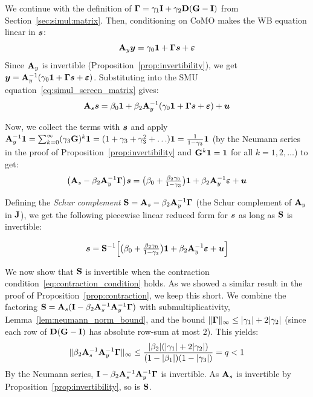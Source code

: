 We continue with the definition of $\mathbf{\Gamma} = \gamma_1\mathbf{I} + \gamma_2\mathbf{D}(\mathbf{G} - \mathbf{I})$ from Section~\ref{sec:simul:matrix}. Then, conditioning on CoMO makes the WB equation linear in $\bm{s}$:
\begin{equation}
    \mathbf{A}_y\bm{y} = \gamma_0\bm{1} + \mathbf{\Gamma}\bm{s} + \bm{\varepsilon}
\end{equation}
Since $\mathbf{A}_y$ is invertible (Proposition~\ref{prop:invertibility}), we get $\bm{y} = \mathbf{A}_y^{-1}(\gamma_0\bm{1} + \mathbf{\Gamma}\bm{s} + \bm{\varepsilon})$. Substituting into the SMU equation~\eqref{eq:simul_screen_matrix} gives:
\begin{equation}
    \mathbf{A}_s\bm{s} = \beta_0\bm{1} + \beta_2\mathbf{A}_y^{-1}(\gamma_0\bm{1} + \mathbf{\Gamma}\bm{s} + \bm{\varepsilon}) + \bm{u}
\end{equation}

Now, we collect the terms with $\bm{s}$ and apply $\mathbf{A}_y^{-1}\bm{1} = \sum_{k = 0}^{\infty} (\gamma_3 \mathbf{G})^k \bm{1} = (1 + \gamma_3 + \gamma_3^2 + \ldots) \bm{1} = \frac{1}{1-\gamma_3}\bm{1}$ (by the Neumann series in the proof of Proposition~\ref{prop:invertibility} and $\mathbf{G}^k \bm{1} = \bm{1}$ for all $k = 1, 2, \ldots$) to get:
\begin{equation}
    \bigl(\mathbf{A}_s - \beta_2\mathbf{A}_y^{-1}\mathbf{\Gamma}\bigr)\bm{s}
    = \bigl(\beta_0 + \tfrac{\beta_2\gamma_0}{1-\gamma_3}\bigr)\bm{1} + \beta_2\mathbf{A}_y^{-1}\bm{\varepsilon} + \bm{u}
\end{equation}

Defining the \emph{Schur complement} $\mathbf{S} = \mathbf{A}_s - \beta_2\mathbf{A}_y^{-1}\mathbf{\Gamma}$ (the Schur complement of $\mathbf{A}_y$ in $\mathbf{J}$), we get the following piecewise linear reduced form for $\bm{s}$ as long as $\mathbf{S}$ is invertible:

\begin{equation}
\label{eq:simul_reduced_s}
    \bm{s} = \mathbf{S}^{-1}\Bigl[\bigl(\beta_0 + \tfrac{\beta_2\gamma_0}{1-\gamma_3}\bigr)\bm{1} + \beta_2\mathbf{A}_y^{-1}\bm{\varepsilon} + \bm{u}\Bigr]
\end{equation}

We now show that $\mathbf{S}$ is invertible when the contraction condition~\eqref{eq:contraction_condition} holds. As we showed a similar result in the proof of Proposition~\ref{prop:contraction}, we keep this short. We combine the factoring $\mathbf{S} = \mathbf{A}_s(\mathbf{I} - \beta_2\mathbf{A}_s^{-1}\mathbf{A}_y^{-1}\mathbf{\Gamma})$ with submultiplicativity, Lemma~\ref{lem:neumann_norm_bound}, and the bound $\|\mathbf{\Gamma}\|_\infty \leq |\gamma_1| + 2|\gamma_2|$ (since each row of $\mathbf{D}(\mathbf{G} - \mathbf{I})$ has absolute row-sum at most $2$). This yields:
\begin{equation}
    \|\beta_2\mathbf{A}_s^{-1}\mathbf{A}_y^{-1}\mathbf{\Gamma}\|_\infty
    \leq \frac{|\beta_2|(|\gamma_1| + 2|\gamma_2|)}{(1-|\beta_1|)(1-|\gamma_3|)} = q < 1
\end{equation}
By the Neumann series, $\mathbf{I} - \beta_2\mathbf{A}_s^{-1}\mathbf{A}_y^{-1}\mathbf{\Gamma}$ is invertible. As $\mathbf{A}_s$ is invertible by Proposition~\ref{prop:invertibility}, so is $\mathbf{S}$.


